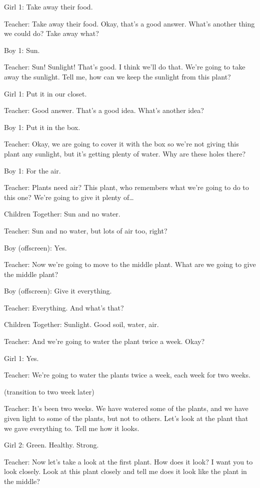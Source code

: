 Girl 1: Take away their food.

Teacher: Take away their food. Okay, that's a good answer. What's another thing we could do? Take away what?

Boy 1: Sun.

Teacher: Sun! Sunlight! That's good. I think we'll do that. We're going to take away the sunlight. Tell me, how can we keep the sunlight from this plant?

Girl 1: Put it in our closet.

Teacher: Good answer. That's a good idea. What's another idea?

Boy 1: Put it in the box.

Teacher: Okay, we are going to cover it with the box so we're not giving this plant any sunlight, but it's getting plenty of water. Why are these holes there?

Boy 1: For the air.

Teacher: Plants need air? This plant, who remembers what we're going to do to this one? We're going to give it plenty of\dots

Children Together: Sun and no water.

Teacher: Sun and no water, but lots of air too, right?

Boy (offscreen): Yes.

Teacher: Now we're going to move to the middle plant. What are we going to give the middle plant?

Boy (offscreen): Give it everything.

Teacher: Everything. And what's that?

Children Together: Sunlight. Good soil, water, air.

Teacher: And we're going to water the plant twice a week. Okay?

Girl 1: Yes.

Teacher: We're going to water the plants twice a week, each week for two weeks.

(transition to two week later)

Teacher: It's been two weeks. We have watered some of the plants, and we have given light to some of the plants, but not to others. Let's look at the plant that we gave everything to. Tell me how it looks.

Girl 2: Green. Healthy. Strong.

Teacher: Now let's take a look at the first plant. How does it look? I want you to look closely. Look at this plant closely and tell me does it look like the plant in the middle?

